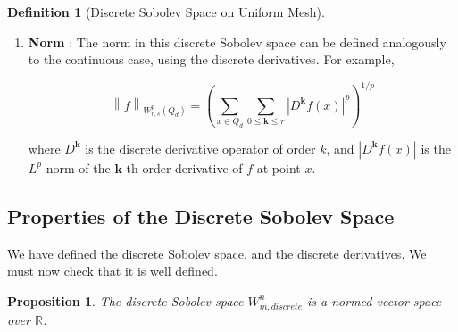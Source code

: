 \documentclass[11pt,a4paper]{article}
\theoremstyle{plain}
\newtheorem{proposition}[theorem]{Proposition}
\theoremstyle{definition}
\newtheorem{definition}[theorem]{Definition}
\theoremstyle{remark}
\begin{document}
\begin{definition}[Discrete Sobolev Space on Uniform Mesh]
\begin{enumerate}
    \item \textbf{Norm} : The norm in this discrete Sobolev space can be defined analogously to the continuous case, using the discrete derivatives. 
    For example,
    
    \[ \left\| f \right\|_{W_{r,s}^{p}(Q_d)} = \left( \sum_{x \in Q_d} \sum_{0 \leq \mathbf{k} \leq r} |D^{\mathbf{k}} f(x)|^p \right)^{1/p} \]
    
    where \( D^{\mathbf{k}} \) is the discrete derivative operator of order \( k \), and \( |D^{\mathbf{k}} f(x)| \) is the \(L^p\)  norm of the \( \mathbf{k} \)-th order derivative of \( f \) at point \( x \).
\end{enumerate}
\end{definition}

\subsection{Properties of the Discrete Sobolev Space}

We have defined the discrete Sobolev space, and the discrete derivatives. We must now check that it is well defined.

\begin{proposition}
    The discrete Sobolev space \( W^{n}_{m, discrete} \) is a normed vector space over \( \mathbb{R} \).
\end{proposition}
\end{document}
